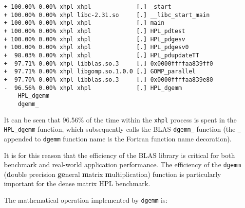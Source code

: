 \lstset{style=term}
\begin{lstlisting}
+ 100.00% 0.00% xhpl xhpl             [.] _start                                                                                        
+ 100.00% 0.00% xhpl libc-2.31.so     [.] __libc_start_main                                                                             
+ 100.00% 0.00% xhpl xhpl             [.] main                                                                                          
+ 100.00% 0.00% xhpl xhpl             [.] HPL_pdtest                                                                                    
+ 100.00% 0.00% xhpl xhpl             [.] HPL_pdgesv                                                                                    
+ 100.00% 0.00% xhpl xhpl             [.] HPL_pdgesv0                                                                                   
+  98.03% 0.00% xhpl xhpl             [.] HPL_pdupdateTT                                                                                
+  97.71% 0.00% xhpl libblas.so.3     [.] 0x0000ffffaa839ff0                                                                            
+  97.71% 0.00% xhpl libgomp.so.1.0.0 [.] GOMP_parallel                                                                                 
+  97.70% 0.00% xhpl libblas.so.3     [.] 0x0000ffffaa839e80                                                                            
-  96.56% 0.00% xhpl xhpl             [.] HPL_dgemm                                                                                     
    HPL_dgemm                                                                                                                                           
    dgemm_            
\end{lstlisting}

It can be seen that 96.56\% of the time within the \verb|xhpl| process is spent in the \verb|HPL_dgemm| function, which subsequently calls the BLAS \verb|dgemm_| function (the \verb|_| appended to \verb|dgemm| function name is the Fortran function name decoration).
 
It is for this reason that the efficiency of the BLAS library is critical for both benchmark and real-world application performance. The efficiency of the \verb|dgemm| (\textbf{d}ouble precision \textbf{ge}neral \textbf{m}atrix \textbf{m}ultiplication) function is particularly important for the dense matrix HPL benchmark.

The mathematical operation implemented by \verb|dgemm| is:

